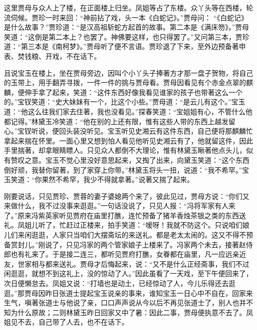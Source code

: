 \begin{parag}
    这里贾母与众人上了楼，在正面楼上归坐。凤姐等占了东楼。众丫头等在西楼，轮流伺候。贾珍一时来回：“神前拈了戏，头一本《白蛇记》。”贾母问： “《白蛇记》是什么故事？”贾珍道：“是汉高祖斩蛇方起首的故事。第二本是《满床笏》。”贾母笑道：“这倒是第二本上？也罢了。神佛要这样，也只得罢了。”又问第三本，贾珍道：“第三本是《南柯梦》。”贾母听了便不言语。贾珍退了下来，至外边预备著申表、焚钱粮、开戏，不在话下。
\end{parag}


\begin{parag}
    且说宝玉在楼上，坐在贾母旁边，因叫个小丫头子捧著方才那一盘子贺物，将自己的玉带上，用手翻弄寻拨，一件一件的挑与贾母看。贾母因看见有个赤金点翠的麒麟，便伸手拿了起来，笑道：“这件东西好像我看见谁家的孩子也带著这么一个的。”宝钗笑道：“史大妹妹有一个，比这个小些。”贾母道：“是云儿有这个。”宝玉道：“他这么往我们家去住著，我也没看见。”探春笑道：“宝姐姐有心，不管什么他都记得。”林黛玉冷笑道：“他在别的上还有限，惟有这些人带的东西上越发留心。”宝钗听说，便回头装没听见。宝玉听见史湘云有这件东西，自己便将那麒麟忙拿起来揣在怀里。一面心里又想到怕人看见他听见史湘云有了，他就留这件，因此手里揣著，却拿眼睛瞟人。只见众人都倒不大理论，惟有林黛玉瞅著他点头儿，似有赞叹之意。宝玉不觉心里没好意思起来，又掏了出来，向黛玉笑道：“这个东西倒好顽，我替你留著，到了家穿上你带。”林黛玉将头一扭，说道：“我不希罕。”宝玉笑道：“你果然不希罕，我少不得就拿著。”说著又揣了起来。
\end{parag}


\begin{parag}
    刚要说话，只见贾珍、贾蓉的妻子婆媳两个来了，彼此见过，贾母方说：“你们又来做什么，我不过没事来逛逛。”一句话没说了，只见人报：“冯将军家有人来了。”原来冯紫英家听见贾府在庙里打醮，连忙预备了猪羊香烛茶银之类的东西送礼。凤姐儿听了，忙赶过正楼来，拍手笑道：“嗳呀！我就不防这个。只说咱们娘儿们来闲逛逛，人家只当咱们大摆斋坛的来送礼。都是老太太闹的。这又不得不预备赏封儿。”刚说了，只见冯家的两个管家娘子上楼来了。冯家两个未去，接著赵侍郎也有礼来了。于是接二连三，都听见贾府打醮，女眷都在庙里，凡一应远亲近友，世家相与都来送礼。贾母才后悔起来，说：“又不是什么正经斋事，我们不过闲逛逛，就想不到这礼上，没的惊动了人。”因此虽看了一天戏，至下午便回来了，次日便懒怠去。凤姐又说：“打墙也是动土，已经惊动了人，今儿乐得还去逛逛。”那贾母因昨日张道士提起宝玉说亲的事来，谁知宝玉一日心中不自在，回家来生气，嗔著张道士与他说了亲，口口声声说从今以后不再见张道士了，别人也并不知为什么原故；二则林黛玉昨日回家又中了暑：因此二事，贾母便执意不去了。凤姐见不去，自己带了人去，也不在话下。
\end{parag}


